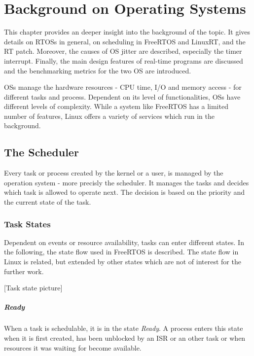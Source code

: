 \chapter{Background on Operating Systems}\label{ch_background}

This chapter provides an deeper insight into the background of the topic. It gives details on \acp{RTOS} in general, on scheduling in FreeRTOS and LinuxRT, and the RT patch. 
Moreover, the causes of \ac{OS} jitter are described, especially the timer interrupt. 
Finally, the main design features of real-time programs are discussed and the benchmarking metrics for the two \ac{OS} are introduced. 
\par
\acp{OS} manage the hardware resources - \ac{CPU} time, \ac{I/O} and memory access  - for different tasks and process. 
Dependent on its level of functionalities, \acp{OS} have different levels of complexity.
While a system like FreeRTOS has a limited number of features, Linux offers a variety of services which run in the background. 

\section{The Scheduler}\label{s_scheduler}
Every task or process created by the kernel or a user, is managed by the operation system - more precisly the scheduler. 
It manages the tasks and decides which task is allowed to operate next. 
The decision is based on the priority and the current state of the task. 

\subsection{Task States}\label{ss_task_states}
Dependent on events or resource availability, tasks can enter different states. 
In the following, the state flow used in FreeRTOS \cite{freertos} is described. 
The state flow in Linux is related, but extended by other states which are not of interest for the further work. 
\par

[Task state picture]

\paragraph{Ready}
When a task is schedulable, it is in the state \textit{Ready}. 
A process enters this state when it is first created, has been unblocked by an \ac{ISR} or an other task or when resources it was waiting for become available.

